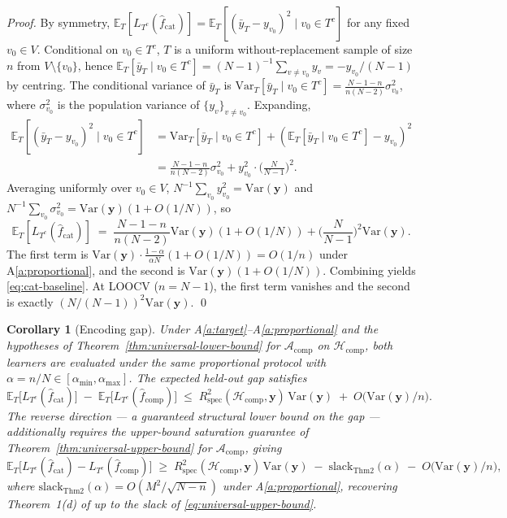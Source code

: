 \documentclass[11pt,a4paper]{article}
\theoremstyle{plain}
\newtheorem{corollary}[theorem]{Corollary}
\theoremstyle{definition}
\theoremstyle{remark}
\newcommand{\by}{\mathbf{y}}
\newcommand{\E}{\mathbb{E}}
\newcommand{\Var}{\mathrm{Var}}
\newcommand{\Rspec}{R^2_{\mathrm{spec}}}
\newcommand{\Acal}{\mathcal{A}}
\newcommand{\Hcal}{\mathcal{H}}
\begin{document}
\begin{proof}
By symmetry, $\E_T[L_{T^c}(\hat f_{\mathrm{cat}})] = \E_T[(\bar y_T
- y_{v_0})^2 \mid v_0 \in T^c]$ for any fixed $v_0 \in V$.
Conditional on $v_0 \in T^c$, $T$ is a uniform without-replacement
sample of size $n$ from $V \setminus \{v_0\}$, hence
$\E_T[\bar y_T \mid v_0 \in T^c] = (N-1)^{-1}\sum_{v \neq v_0} y_v
= -y_{v_0}/(N-1)$ by centring. The conditional variance of
$\bar y_T$ is
$\Var_T[\bar y_T \mid v_0 \in T^c] = \frac{N-1-n}{n(N-2)}\sigma^2_{v_0}$,
where $\sigma^2_{v_0}$ is the population variance of $\{y_v\}_{v
\neq v_0}$. Expanding,
\begin{align*}
    \E_T[(\bar y_T - y_{v_0})^2 \mid v_0 \in T^c]
    &= \Var_T[\bar y_T \mid v_0 \in T^c]
        + (\E_T[\bar y_T \mid v_0 \in T^c] - y_{v_0})^2 \\
    &= \frac{N-1-n}{n(N-2)}\sigma^2_{v_0}
        + y_{v_0}^2 \cdot \Big(\frac{N}{N-1}\Big)^{\!2}.
\end{align*}
Averaging uniformly over $v_0 \in V$, $N^{-1}\sum_{v_0} y_{v_0}^2 =
\Var(\by)$ and $N^{-1}\sum_{v_0}\sigma^2_{v_0} = \Var(\by)(1 +
O(1/N))$, so
\[
    \E_T[L_{T^c}(\hat f_{\mathrm{cat}})]
    \;=\; \frac{N-1-n}{n(N-2)}\Var(\by)(1 + O(1/N))
        + \Big(\frac{N}{N-1}\Big)^{\!2}\Var(\by).
\]
The first term is $\Var(\by) \cdot \frac{1-\alpha}{\alpha N} (1 +
O(1/N)) = O(1/n)$ under A\ref{a:proportional}, and the second is
$\Var(\by)(1 + O(1/N))$. Combining yields
\eqref{eq:cat-baseline}. At LOOCV ($n = N-1$), the first term
vanishes and the second is exactly $(N/(N-1))^2 \Var(\by)$. \qed
\end{proof}

\begin{corollary}[Encoding gap]
\label{cor:encoding-gap}
Under A\ref{a:target}--A\ref{a:proportional} and the hypotheses of
Theorem~\ref{thm:universal-lower-bound} for $\Acal_{\mathrm{comp}}$
on $\Hcal_{\mathrm{comp}}$, both learners are evaluated under the
same proportional protocol with $\alpha = n/N \in [\alpha_{\min},
\alpha_{\max}]$. The expected held-out gap satisfies
\begin{equation}
    \E_T\!\big[L_{T^c}(\hat f_{\mathrm{cat}})\big]
        \;-\; \E_T\!\big[L_{T^c}(\hat f_{\mathrm{comp}})\big]
    \;\le\; \Rspec(\Hcal_{\mathrm{comp}}, \by)\,\Var(\by)
        \;+\; O\!\big(\Var(\by)/n\big).
    \label{eq:encoding-gap-upper}
\end{equation}
The reverse direction --- a guaranteed structural \emph{lower}
bound on the gap --- additionally requires the upper-bound
saturation guarantee of
Theorem~\ref{thm:universal-upper-bound} for
$\Acal_{\mathrm{comp}}$, giving
\begin{equation*}
    \E_T\!\big[L_{T^c}(\hat f_{\mathrm{cat}}) - L_{T^c}(\hat f_{\mathrm{comp}})\big]
    \;\ge\; \Rspec(\Hcal_{\mathrm{comp}}, \by)\,\Var(\by)
        \;-\; \mathrm{slack}_{\mathrm{Thm 2}}(\alpha)
        \;-\; O\!\big(\Var(\by)/n\big),
\end{equation*}
where $\mathrm{slack}_{\mathrm{Thm 2}}(\alpha) = O(M^2/\sqrt{N-n})$
under A\ref{a:proportional}, recovering Theorem~1(d) of
\citet{FossePallares2026applicabilityBound} up to the slack of
\eqref{eq:universal-upper-bound}.
\end{corollary}
\end{document}

